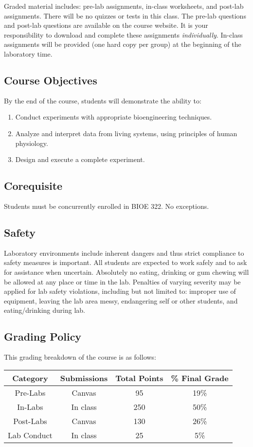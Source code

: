 \documentclass{article}
\begin{document}
Graded material includes: pre-lab assignments, in-class worksheets, and post-lab assignments.  There will be no quizzes or tests in this class. The pre-lab questions and post-lab questions are available on the course website. It is your responsibility to download and complete these assignments \textit{individually}. In-class assignments will be provided (one hard copy per group) at the beginning of the laboratory time.

\subsection*{Course Objectives}
By the end of the course, students will demonstrate the ability to:
\begin{enumerate}
	\item Conduct experiments with appropriate bioengineering techniques.
	\item Analyze and interpret data from living systems, using principles of human physiology.
	\item Design and execute a complete experiment.
\end{enumerate}

\subsection*{Corequisite}
Students must be concurrently enrolled in BIOE 322. No exceptions.

\subsection*{Safety}
Laboratory environments include inherent dangers and thus strict compliance to safety measures is important. All students are expected to work safely and to ask for assistance when uncertain. Absolutely no eating, drinking or gum chewing will be allowed at any place or time in the lab. Penalties of varying severity may be applied for lab safety violations, including but not limited to: improper use of equipment, leaving the lab area messy, endangering self or other students, and eating/drinking during lab.

\subsection*{Grading Policy}

This grading breakdown of the course is as follows:
\begin{table}[h!]
	\centering
\begin{tabular}[h!]{cccc}
\toprule
	Category & Submissions & Total Points & \% Final Grade\\
	\midrule
	Pre-Labs & Canvas & 95 & 19\%\\
	In-Labs & In class & 250 & 50\%\\
	Post-Labs & Canvas & 130 & 26\%\\
	Lab Conduct & In class & 25 & 5\%\\
	\bottomrule
\end{tabular}
\end{table}
\end{document}
